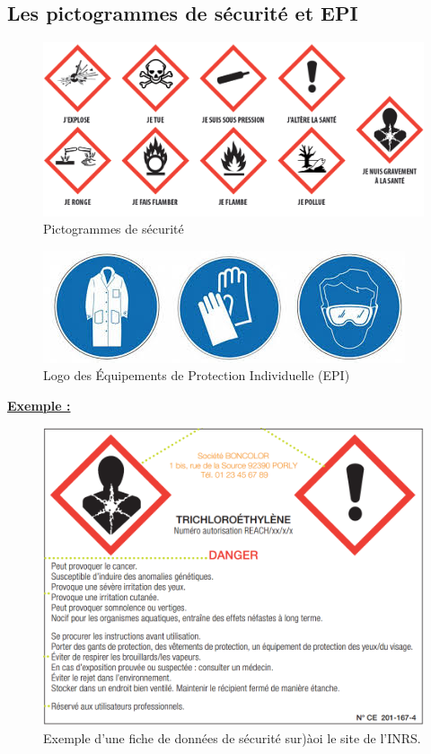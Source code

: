 \subsection{Les pictogrammes de sécurité et EPI}
\begin{figure}[!h]
    \centering
    \includegraphics[scale=1]{Images/Methodo/Fiche_Methode1/Pictogrammes.png}
    \caption{Pictogrammes de sécurité}
    \label{fig:enter-label}
\end{figure}

\begin{figure}[!h]
    \centering
    \includegraphics[scale=0.9]{Images/Methodo/Fiche_Methode1/picto_gant_blouse_lunette.jpg}
    \caption{Logo des \'{E}quipements de Protection Individuelle (EPI)}
    \label{fig:enter-label}
\end{figure}


\underline{\textbf{Exemple :}}
\begin{figure}[!h]
    \centering
    \includegraphics[scale=0.7]{Images/Methodo/Fiche_Methode1/Exemple_fiche_toxico.PNG}
    \caption{Exemple d'une fiche de données de sécurité sur)àoi le site de l'INRS.}
    \label{fig:enter-label}
\end{figure}


